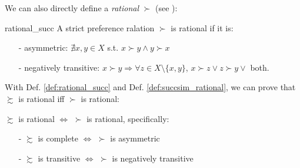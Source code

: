 We can also directly define a \textit{rational} $\succ$ (see \citet[Page 19-21]{kreps1990acourse}):
\begin{definition}{}{rational_succ}
    A strict preference ralation $\succ$ is rational if it is:
    \begin{enumerate}
        \item[-] asymmetric: $\nexists x,y\in X$ s.t. $x\succ y \land y\succ x$
        \item[-] negatively transitive: $x\succ y \Rightarrow \forall z\in X\setminus\{x,y\}$, $x\succ z\lor z\succ y \lor$ both. 
    \end{enumerate}
\end{definition}

With Def. \ref{def:rational_succ} and Def. \ref{def:succsim_rational}, we can prove that $\succsim$ is rational iff $\succ$ is rational:
\begin{theorem}{}{}
    $\succsim$ is rational $\Leftrightarrow$ $\succ$ is rational, specifically:
    \begin{enumerate}
        \item[-] $\succsim$ is complete $\Leftrightarrow$ $\succ$ is asymmetric
        \item[-] $\succsim$ is transitive $\Leftrightarrow$ $\succ$ is negatively transitive
    \end{enumerate}
\end{theorem}


